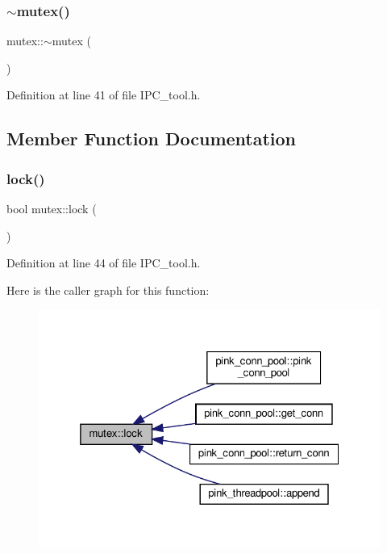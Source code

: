 \mbox{\label{classmutex_ae30185d87a48c5451a04c2861ba3d034}} 
\subsubsection{\texorpdfstring{$\sim$mutex()}{~mutex()}}
{\footnotesize\ttfamily mutex\+::$\sim$mutex (\begin{DoxyParamCaption}{ }\end{DoxyParamCaption})\hspace{0.3cm}{\ttfamily [inline]}}



Definition at line 41 of file I\+P\+C\+\_\+tool.\+h.



\subsection{Member Function Documentation}
\mbox{\label{classmutex_afc56ba139d699d2d9d388141209c6e43}} 
\subsubsection{\texorpdfstring{lock()}{lock()}}
{\footnotesize\ttfamily bool mutex\+::lock (\begin{DoxyParamCaption}{ }\end{DoxyParamCaption})\hspace{0.3cm}{\ttfamily [inline]}}



Definition at line 44 of file I\+P\+C\+\_\+tool.\+h.

Here is the caller graph for this function\+:\nopagebreak
\begin{figure}[H]
\begin{center}
\leavevmode
\includegraphics[width=325pt]{classmutex_afc56ba139d699d2d9d388141209c6e43_icgraph}
\end{center}
\end{figure}
\mbox{\label{classmutex_a47bc4d60f08056af411b57e321959fe1}} 
